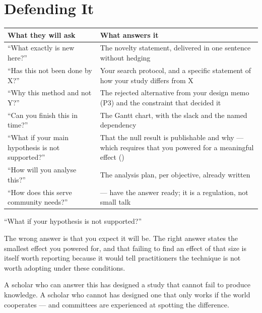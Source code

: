 \section{Defending It}

\begin{center}
\small
\begin{tabular}{@{}L{5.0cm}L{9.3cm}@{}}
\toprule
\textbf{What they will ask} & \textbf{What answers it} \\
\midrule
``What exactly is new here?''
  & The novelty statement, delivered in one sentence without hedging \\
``Has this not been done by X?''
  & Your search protocol, and a specific statement of how your study differs
    from X \\
``Why this method and not Y?''
  & The rejected alternative from your design memo (P3) and the constraint that
    decided it \\
``Can you finish this in time?''
  & The Gantt chart, with the slack and the named dependency \\
``What if your main hypothesis is not supported?''
  & That the null result is publishable and why --- which requires that you
    powered for a meaningful effect () \\
``How will you analyse this?''
  & The analysis plan, per objective, already written \\
``How does this serve community needs?''
  &  --- have the answer ready; it is a regulation,
    not small talk \\
\bottomrule
\end{tabular}
\end{center}

\begin{alertbox}
``What if your hypothesis is not supported?''

\medskip
The wrong answer is that you expect it will be. The right answer states the
smallest effect you powered for, and that failing to find an effect of that
size is itself worth reporting because it would tell practitioners the
technique is not worth adopting under these conditions.

\medskip
A scholar who can answer this has designed a study that cannot fail to produce
knowledge. A scholar who cannot has designed one that only works if the world
cooperates --- and committees are experienced at spotting the difference.
\end{alertbox}

